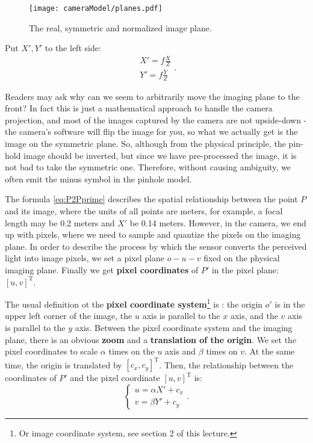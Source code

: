 \begin{figure}[!htp]
	\centering
	\texttt{[image: cameraModel/planes.pdf]}
	\caption{The real, symmetric and normalized image plane.}
	\label{fig:planes}
\end{figure}

Put $X', Y'$ to the left side:
\begin{equation}\label{eq:P2Pprime}
\begin{array}{l}
X' = f\frac{X}{Z}\\
Y' = f\frac{Y}{Z}
\end{array}.
\end{equation}

Readers may ask why can we seem to arbitrarily move the imaging plane to the front? In fact this is just a mathematical approach to handle the camera projection, and most of the images captured by the camera are not upside-down - the camera's software will flip the image for you, so what we actually get is the image on the symmetric plane. So, although from the physical principle, the pin-hold image should be inverted, but since we have pre-processed the image, it is not bad to take the symmetric one. Therefore, without causing ambiguity, we often emit the minus symbol in the pinhole model.

The formula \eqref{eq:P2Pprime} describes the spatial relationship between the point $P$ and its image, where the units of all points are meters,  for example, a focal length may be 0.2 meters and $X'$ be 0.14 meters. However, in the camera, we end up with pixels, where we need to sample and quantize the pixels on the imaging plane. In order to describe the process by which the sensor converts the perceived light into image pixels, we set a pixel plane $o-u-v$ fixed on the physical imaging plane. Finally we get \textbf{pixel coordinates} of $P'$ in the pixel plane: $[u,v]^\mathrm{T}$.

The usual definition ot the \textbf{pixel coordinate system}\footnote{ Or image coordinate system, see section 2 of this lecture. } is : the origin $o'$ is in the upper left corner of the image, the $u$ axis is parallel to the $x$ axis, and the $v$ axis is parallel to the $y$ axis. Between the pixel coordinate system and the imaging plane, there is an obvious \textbf{zoom} and a \textbf{translation of the origin}. We set the pixel coordinates to scale $\alpha$ times on the $u$ axis and $\beta$ times on $v$. At the same time, the origin is translated by $[c_x, c_y]^\mathrm{T}$. Then, the relationship between the coordinates of $P'$ and the pixel coordinate $[u,v]^\mathrm{T}$ is:
\begin{equation}
\label{eq:project2pixel1} 
\left\{
\begin{matrix} 
u=\alpha X' + c_x\\ 
v=\beta Y' + c_y
\end{matrix}
\right. .
\end{equation}

